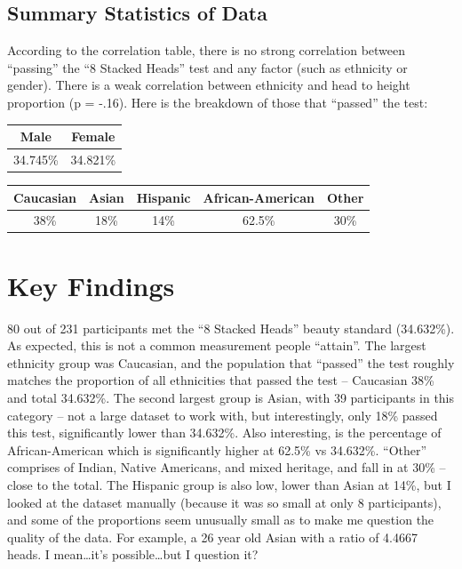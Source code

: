 \documentclass[]{article}
\begin{document}
\subsection{Summary Statistics of Data}
\label{sec:data-summary}

According to the correlation table, there is no strong correlation
between \enquote{passing} the \enquote{8 Stacked Heads} test and any
factor (such as ethnicity or gender). There is a weak correlation
between ethnicity and head to height proportion (p = -.16). Here is the
breakdown of those that \enquote{passed} the test: \vspace{5mm}

\begin{tabular} {c c}
  Male & Female \\ 
  \hline
  34.745\% & 34.821\%
\end{tabular}
\vspace{5mm}

\begin{tabular} { c c c c c}
  Caucasian & Asian & Hispanic & African-American & Other \\
  \hline
  38\% & 18\% & 14\% & 62.5\% & 30\%
\end {tabular}

\section{Key Findings}
\label{sec:findings}

80 out of 231 participants met the \enquote{8 Stacked Heads} beauty
standard (34.632\%). As expected, this is not a common measurement
people \enquote{attain}. The largest ethnicity group was Caucasian, and
the population that \enquote{passed} the test roughly matches the
proportion of all ethnicities that passed the test -- Caucasian 38\% and
total 34.632\%. The second largest group is Asian, with 39 participants
in this category -- not a large dataset to work with, but interestingly,
only 18\% passed this test, significantly lower than 34.632\%. Also
interesting, is the percentage of African-American which is
significantly higher at 62.5\% vs 34.632\%. \enquote{Other} comprises of
Indian, Native Americans, and mixed heritage, and fall in at 30\% --
close to the total. The Hispanic group is also low, lower than Asian at
14\%, but I looked at the dataset manually (because it was so small at
only 8 participants), and some of the proportions seem unusually small
as to make me question the quality of the data. For example, a 26 year
old Asian with a ratio of 4.4667 heads. I mean\ldots it's
possible\ldots but I question it?
\end{document}
